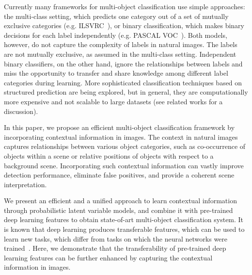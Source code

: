 \documentclass{article}
\begin{document}
Currently many frameworks for multi-object classification use simple approaches:  the multi-class setting, which predicts one category out of a set of mutually exclusive categories (e.g. ILSVRC~\cite{ILSVRC15}), or binary classification, which makes binary decisions for each label independently (e.g. PASCAL VOC~\cite{pascal}). Both models, however, do not capture the complexity of  labels in natural images. The labels are not mutually exclusive, as assumed in the multi-class setting.  Independent binary classifiers, on the other hand, ignore the relationships between labels and miss the   opportunity to transfer and share knowledge among different label categories during learning. More sophisticated classification techniques based on
structured prediction are being explored, but in general, they  are  computationally more expensive and not scalable to large datasets (see related works for a discussion).


In this paper, we propose an efficient multi-object classification framework by   incorporating contextual information in images.  The context in natural images captures relationships between various object categories, such as co-occurrence of objects within a scene or relative positions of objects with respect to a background scene. Incorporating such contextual information   can vastly improve  detection performance, eliminate false positives, and provide a coherent scene interpretation.



We present an efficient and a unified approach to learn contextual information through probabilistic latent variable models, and combine it with pre-trained deep learning features  to obtain state-of-art   multi-object classification system. It is known that deep learning produces transferable features, which can be used to learn new tasks, which differ from tasks on which the neural networks were trained~\cite{transferable,oquab2014learning}. Here,  we demonstrate that    the transferability of pre-trained deep learning features  can be further enhanced by capturing the contextual information in images.

\end{document}
